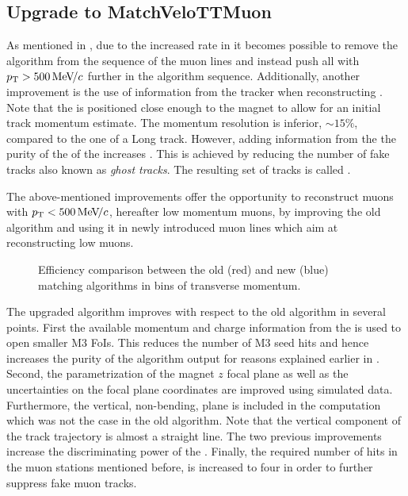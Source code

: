 \subsection{Upgrade to MatchVeloTTMuon}
\label{sec:matchvelottmuon}
As mentioned in , due to the increased \hltone rate in \runtwo it becomes possible to
remove the \mvm algorithm from the sequence of the \hltone muon lines and instead push all \veloTracks with
$\mbox{$p_{\rm T}$}>500 {\mathrm{\,Me\kern -0.1em V\!/}c}$ further in the algorithm sequence. Additionally, another improvement is the use of
information from the \ttracker tracker when reconstructing \veloTracks \cite{LHCb-PUB-2015-005}.
Note that the \ttracker is positioned close enough to the \lhcb magnet to allow for an initial track momentum estimate.
The \ttracker momentum resolution is inferior, $\sim 15\%$, compared to the one of a Long track.
However, adding information from the \ttracker the purity of the of the \veloTracks increases \cite{Bowen:2105078}.
This is achieved by reducing the number of fake tracks also known as {\it ghost tracks}.
The resulting set of tracks is called \veloTTracks.

The above-mentioned improvements offer the opportunity to reconstruct muons with $\mbox{$p_{\rm T}$}<500 {\mathrm{\,Me\kern -0.1em V\!/}c}$,
hereafter low momentum muons, by improving the old \mvm algorithm and using it in newly introduced
\hltone muon lines which aim at reconstructing low \pt muons.

\begin{figure}[t]
  \centering
    \scalebox{.6}{}
  \caption{Efficiency comparison between the old (red) and new (blue) matching algorithms in bins of transverse momentum.}
 \label{mvm_eff_pt_zoom_comp}
\end{figure}

The upgraded \mvTTm algorithm improves with respect to the old \mvm algorithm in several points.
First the available momentum and charge information from the \ttracker is used to open smaller M3 FoIs.
This reduces the number of M3 seed hits and hence increases the purity of the \mvTTm algorithm output
for reasons explained earlier in . Second, the parametrization of the magnet $z$
focal plane as well as the uncertainties on the focal plane coordinates are improved using simulated data.
Furthermore, the vertical, non-bending, plane is included in the \chisq computation which was not the
case in the old \mvm algorithm. Note that the vertical component of the track trajectory is almost a straight
line. The two previous improvements increase the discriminating power of the \chisq. Finally, the required number
of hits in the muon stations mentioned before, is increased to four in order to further
suppress fake muon tracks.

